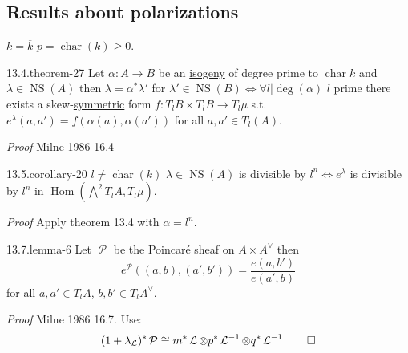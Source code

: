 \documentclass[10pt,]{book}
\makeatletter
\renewcommand*{\proofname}{Proof}
\renewenvironment{proof}[1][\proofname]{\par
  \pushQED{\qed}%
  \normalfont \topsep6\p@\@plus6\p@\relax
  \trivlist
  \item\relax
    {\itshape
    #1\@addpunct{.}}\hspace\labelsep\ignorespaces
}{%
  \popQED\endtrivlist\@endpefalse
}
\numberwithin{equation}{section}
\newcommand{\sheaf}[1]{\operatorname{\mathcal{#1}}}
\DeclareMathOperator{\Hom}{Hom}
\DeclareMathOperator{\characteristic}{char}
\DeclareMathOperator{\NS}{NS}
\makeatother
\begin{document}
%
%
\typeout{************************************************}
\typeout{************************************************}
%
\subsection[{Results about polarizations}]{Results about polarizations}\label{subsection-29}
\hypertarget{p-309}{}%
\(k = \overline k\) \(p = \characteristic (k) \ge 0\).%
\begin{theorem}{13.4.}{}{theorem-27}%
\hypertarget{p-310}{}%
Let \(\alpha\colon A\to B\) be an \hyperref[def-supersing-isog-isog]{isogeny} of degree prime to \(\characteristic k\) and \(\lambda \in \NS(A)\) then \(\lambda = \alpha^* \lambda '\) for \(\lambda ' \in \NS(B) \iff \forall l |\deg(\alpha)\) \(l\) prime there exists a skew-\hyperref[def-princ-pol]{symmetric} form \(f\colon T_lB\times T_lB \to T_l\mu\) s.t. \(e^\lambda(a,a') = f(\alpha(a), \alpha(a'))\) for all \(a,a' \in T_l(A)\).%
\end{theorem}
\begin{proof}\hypertarget{proof-50}{}
\hypertarget{p-311}{}%
Milne 1986 16.4%
\end{proof}
\begin{corollary}{13.5.}{}{corollary-20}%
\hypertarget{p-312}{}%
\(l \ne \characteristic (k)\) \(\lambda \in \NS(A) \) is divisible by \(l^n \iff e^\lambda\) is divisible by \(l^n\) in \(\Hom (\bigwedge^2 T_lA, T_l \mu)\).%
\end{corollary}
\begin{proof}\hypertarget{proof-51}{}
\hypertarget{p-313}{}%
Apply theorem 13.4 with \(\alpha = l^n\).%
\end{proof}
\begin{lemma}{13.7.}{}{lemma-6}%
\hypertarget{p-314}{}%
Let \(\sheaf P\) be the Poincaré sheaf on \(A\times A^\vee\) then%
\begin{equation*}
e^{\sheaf P} ((a,b),(a',b')) = \frac{e(a,b')}{e(a',b)}
\end{equation*}
for all \(a,a' \in T_l A\), \(b,b' \in T_l A^\vee\).%
\end{lemma}
\begin{proof}\hypertarget{proof-52}{}
\hypertarget{p-315}{}%
Milne 1986 16.7. Use:%
\begin{equation*}
(1+ \lambda_{\sheaf L})^* \sheaf P \cong m^* \sheaf L \otimes p^* \sheaf L^{-1} \otimes q^* \sheaf L^{-1}\qedhere
\end{equation*}
%
\end{proof}
\end{document}
